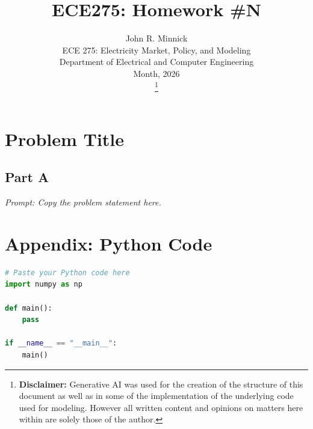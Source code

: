 \documentclass[journal, onecolumn, 12pt]{IEEEtran}
\title{ECE275: Homework \#N}
\author{John R. Minnick\\
ECE 275: Electricity Market, Policy, and Modeling \\
Department of Electrical and Computer Engineering\\
Month, 2026\\
\thanks{\textbf{Disclaimer:} Generative AI was used for the creation of the structure of this document as well as in some of the implementation of the underlying code used for modeling. However all written content and opinions on matters here within are solely those of the author.}
}
\begin{document}
\maketitle


\section{Problem Title}

\subsection{Part A}
\textit{Prompt: Copy the problem statement here.}\\


\newpage

\section{Appendix: Python Code}
\begin{lstlisting}[language=Python, caption=Solution Code]
# Paste your Python code here
import numpy as np

def main():
    pass

if __name__ == "__main__":
    main()
\end{lstlisting}
\end{document}
